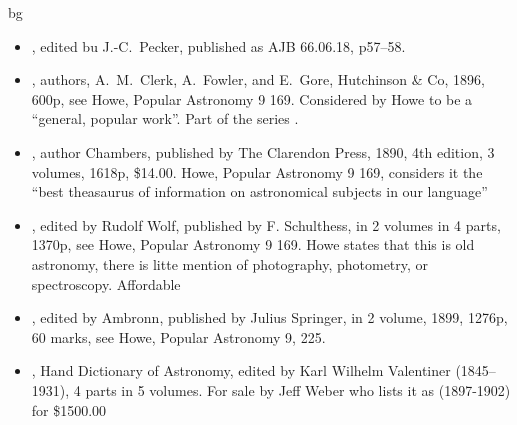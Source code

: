 bg

\begin{itemize}

  \item {}, edited bu J.-C.~Pecker,
    published as 
    AJB 66.06.18, p57--58.

  \item {}, authors, A.~M.~Clerk,
    A.~Fowler, and E.~Gore, Hutchinson \& Co, 1896, 600p, see Howe,
    Popular Astronomy 9 169.  Considered by Howe to be a ``general,
    popular work''. Part of the series .

  \item {}, author
    Chambers, published by The Clarendon Press, 1890, 4th edition, 3
    volumes, 1618p, \$14.00. Howe, Popular Astronomy 9 169, considers
    it the ``best theasaurus of information on astronomical subjects
    in our language''
    
  \item {}, edited by Rudolf Wolf, published
    by F. Schulthess, in 2 volumes in 4 parts, 1370p, see Howe,
    Popular Astronomy 9 169. Howe states that this is old astronomy,
    there is litte mention of photography, photometry, or
    spectroscopy. Affordable
  
  \item {}, edited by
    Ambronn, published by Julius Springer, in 2 volume, 1899, 1276p,
    60 marks, see Howe, Popular Astronomy 9, 225.
  
  \item {}, Hand
    Dictionary of Astronomy, edited by Karl Wilhelm Valentiner
    (1845--1931), 4 parts in 5 volumes. For sale by Jeff Weber who
    lists it as (1897-1902) for \$1500.00


\end{itemize}
